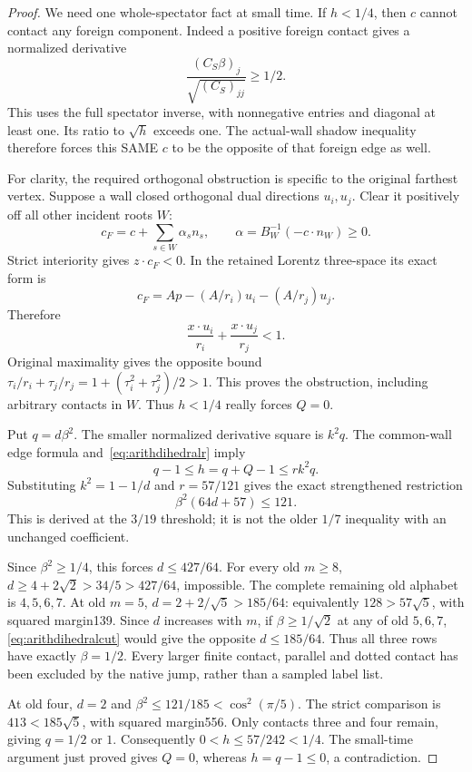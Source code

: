 \documentclass[11pt]{article}
\begin{document}
\begin{proof}
We need one whole-spectator fact at small time.
If \(h<1/4\), then \(c\) cannot contact any foreign component.
Indeed a positive foreign contact gives a normalized derivative
\[
 {\frac{(C_S\beta)_j}{\sqrt{(C_S)_{jj}}}}\ge1/2 .
\]
This uses the full spectator inverse, with nonnegative entries
and diagonal at least one.
Its ratio to \(\sqrt h\) exceeds one.
The actual-wall shadow inequality therefore forces this SAME
\(c\) to be the opposite of that foreign edge as well.

For clarity, the required orthogonal obstruction is specific to
the original farthest vertex.  Suppose a wall closed orthogonal
dual directions \(u_i,u_j\).
Clear it positively off all other incident roots \(W\):
\[
 c_F=c+\sum_{s\in W}\alpha_sn_s,\qquad
 \alpha=B_W^{-1}(-c\cdot n_W)\ge0.
\]
Strict interiority gives \(z\cdot c_F<0\).
In the retained Lorentz three-space its exact form is
\[
 c_F=A p-(A/r_i)u_i-(A/r_j)u_j .
\]
Therefore
\[
 {\frac{x\cdot u_i}{r_i}}+{\frac{x\cdot u_j}{r_j}}<1.
\]
Original maximality gives the opposite bound
\(\tau_i/r_i+\tau_j/r_j
 =1+(\tau_i^2+\tau_j^2)/2>1\).
This proves the obstruction, including arbitrary contacts in \(W\).
Thus \(h<1/4\) really forces \(Q=0\).

Put \(q=d\beta^2\).
The smaller normalized derivative square is \(k^2q\).
The common-wall edge formula and~\eqref{eq:arithdihedralr} imply
\[
 q-1\le h=q+Q-1\le rk^2q .
\]
Substituting \(k^2=1-1/d\) and \(r=57/121\) gives the exact
strengthened restriction
\[
                         \beta^2(64d+57)\le121 .
\tag{Dih2}\label{eq:arithdihedralcut}
\]
This is derived at the \(3/19\) threshold; it is not the older
\(1/7\) inequality with an unchanged coefficient.

Since \(\beta^2\ge1/4\), this forces \(d\le427/64\).
For every old \(m\ge8\),
\(d\ge4+2\sqrt2>34/5>427/64\), impossible.
The complete remaining old alphabet is \(4,5,6,7\).
At old \(m=5\),
\(d=2+2/\sqrt5>185/64\):
equivalently \(128>57\sqrt5\), with squared margin139.
Since \(d\) increases with \(m\), if
\(\beta\ge1/\sqrt2\) at any of old \(5,6,7\),
\eqref{eq:arithdihedralcut} would give the opposite
\(d\le185/64\).
Thus all three rows have exactly \(\beta=1/2\).
Every larger finite contact, parallel and dotted contact has
been excluded by the native jump, rather than a sampled label list.

At old four, \(d=2\) and
\(\beta^2\le121/185<\cos^2(\pi/5)\).
The strict comparison is \(413<185\sqrt5\), with squared
margin556.  Only contacts three and four remain, giving
\(q=1/2\) or \(1\).
Consequently \(0<h\le57/242<1/4\).
The small-time argument just proved gives \(Q=0\), whereas
\(h=q-1\le0\), a contradiction.


\end{proof}
\end{document}
